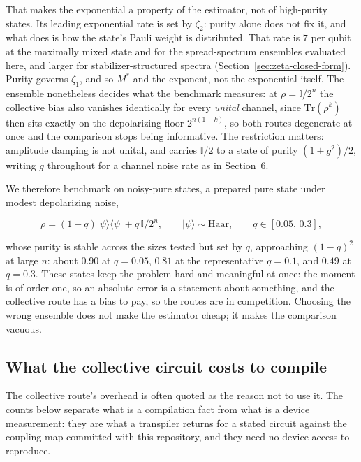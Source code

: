 \documentclass[a4paper,superscriptaddress,nofootinbib,onecolumn,nopdfoutputerror]{quantumarticle}
\begin{document}
That makes the exponential a property of the estimator, not of high-purity states. Its leading exponential rate is set by
\(\zeta_2\): purity alone does not fix it, and what does is how the
state's Pauli weight is distributed. That rate is \(7\) per qubit at the
maximally mixed state and for the spread-spectrum ensembles evaluated
here, and larger for stabilizer-structured spectra
(Section~\ref{sec:zeta-closed-form}). Purity governs \(\zeta_1\), and so
\(M^*\) and the exponent, not the exponential itself. The ensemble
nonetheless decides what the benchmark measures: at
\(\rho = \mathbb{I}/2^n\) the collective bias also vanishes identically
for every \emph{unital} channel, since \(\mathrm{Tr}(\rho^k)\) then sits
exactly on the depolarizing floor \(2^{n(1-k)}\), so both routes
degenerate at once and the comparison stops being informative. The
restriction matters: amplitude damping is not unital, and carries
\(\mathbb{I}/2\) to a state of purity \((1 + g^2)/2\), writing \(g\) throughout for a channel
noise rate as in Section~6.

We therefore benchmark on noisy-pure states, a prepared pure state under
modest depolarizing noise,

\[\rho = (1-q)\lvert \psi \rangle \langle \psi \rvert + q\,\mathbb{I}/2^n, \qquad \lvert \psi \rangle \sim \text{Haar}, \qquad q \in [0.05,\, 0.3],\]

whose purity is stable across the sizes tested but set by \(q\),
approaching \((1-q)^2\) at large \(n\): about \(0.90\) at \(q = 0.05\),
\(0.81\) at the representative \(q = 0.1\), and \(0.49\) at \(q = 0.3\).
These states keep the problem hard and meaningful at once: the moment
is of order one, so an absolute error is a statement about something, and
the collective route has a bias to pay, so the routes are in competition.
Choosing the wrong ensemble does not make the estimator cheap; it makes
the comparison vacuous.

\hypertarget{what-the-collective-circuit-costs-to-compile}{%
\subsection{What the collective circuit costs to compile}\label{sec:compilation}}

The collective route's overhead is often quoted as the reason not to use it. The counts below
separate what is a compilation fact from what is a device measurement: they are what a transpiler returns for a stated circuit against the coupling map committed
with this repository, and they need no device access to reproduce.
\end{document}
